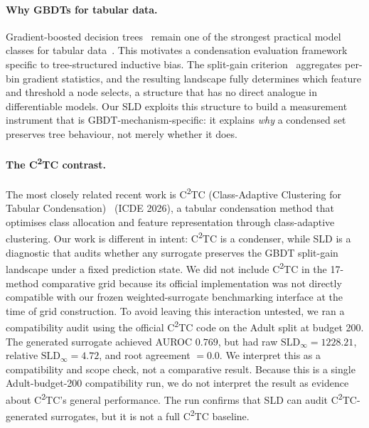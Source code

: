 \paragraph{Why GBDTs for tabular data.}
Gradient-boosted decision trees~\cite{friedman2001gbm,chen2016xgboost,
ke2017lightgbm,prokhorenkova2018catboost} remain one of the strongest practical
model classes for tabular data~\cite{grinsztajn2022why,borisov2022survey}. This
motivates a condensation evaluation framework specific to tree-structured
inductive bias. The split-gain criterion~\cite{loh2011cart,natekin2013tutorial}
aggregates per-bin gradient statistics, and the resulting landscape fully
determines which feature and threshold a node selects, a structure that has no
direct analogue in differentiable models. Our SLD exploits this structure to
build a measurement instrument that is GBDT-mechanism-specific: it explains
\emph{why} a condensed set preserves tree behaviour, not merely whether it does.

\paragraph{The C\textsuperscript{2}TC contrast.}
The most closely related recent work is C\textsuperscript{2}TC
(Class-Adaptive Clustering for Tabular Condensation)~\cite{xu2026c2tc}
(ICDE 2026), a tabular condensation method that optimises class
allocation and feature representation through class-adaptive clustering. Our
work is different in intent: C\textsuperscript{2}TC is a condenser, while SLD
is a diagnostic that audits whether any surrogate preserves the GBDT
split-gain landscape under a fixed prediction state. We did not include
C\textsuperscript{2}TC in the 17-method comparative grid because its official
implementation was not directly compatible with our frozen weighted-surrogate
benchmarking interface at the time of grid construction. To avoid leaving this
interaction untested, we ran a compatibility audit using the official
C\textsuperscript{2}TC code on the Adult split at budget 200. The generated
surrogate achieved AUROC $0.769$, but had raw $\mathrm{SLD}_\infty=1228.21$,
relative $\mathrm{SLD}_\infty=4.72$, and root agreement $=0.0$. We interpret
this as a compatibility and scope check, not a comparative result. Because this
is a single Adult-budget-200 compatibility run, we do not interpret the result as
evidence about C\textsuperscript{2}TC's general performance. The run confirms
that SLD can audit C\textsuperscript{2}TC-generated surrogates, but it is not a
full C\textsuperscript{2}TC baseline.
